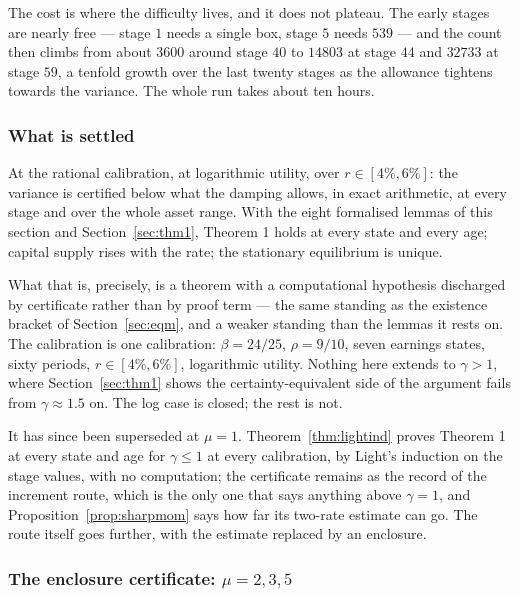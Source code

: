 The cost is where the difficulty lives, and it does not plateau. The early stages are nearly free ---
stage $1$ needs a single box, stage $5$ needs $539$ --- and the count then climbs from about $3600$
around stage $40$ to $14803$ at stage $44$ and $32733$ at stage $59$, a tenfold growth over the last
twenty stages as the allowance tightens towards the variance. The whole run takes about ten hours.

\subsubsection*{What is settled}

At the rational calibration, at logarithmic utility, over $r\in[4\%,6\%]$: the variance is certified
below what the damping allows, in exact arithmetic, at every stage and over the whole asset range.
With the eight formalised lemmas of this section and Section~\ref{sec:thm1}, Theorem 1 holds at every
state and every age; capital supply rises with the rate; the stationary equilibrium is unique.

What that is, precisely, is a theorem with a computational hypothesis discharged by certificate rather
than by proof term --- the same standing as the existence bracket of Section~\ref{sec:eqm}, and a
weaker standing than the lemmas it rests on. The calibration is one calibration: $\beta=24/25$,
$\rho=9/10$, seven earnings states, sixty periods, $r\in[4\%,6\%]$, logarithmic utility. Nothing here
extends to $\gamma>1$, where Section~\ref{sec:thm1} shows the certainty-equivalent side of the
argument fails from $\gamma\approx1.5$ on. The log case is closed; the rest is not.

It has since been superseded at $\mu=1$. Theorem~\ref{thm:lightind} proves Theorem 1 at every state
and age for $\gamma\le1$ at every calibration, by Light's induction on the stage values, with no
computation; the certificate remains as the record of the increment route, which is the only one
that says anything above $\gamma=1$, and Proposition~\ref{prop:sharpmom} says how far its two-rate
estimate can go. The route itself goes further, with the estimate replaced by an enclosure.

\subsubsection*{The enclosure certificate: $\mu=2,3,5$}\label{sec:enclcert}

